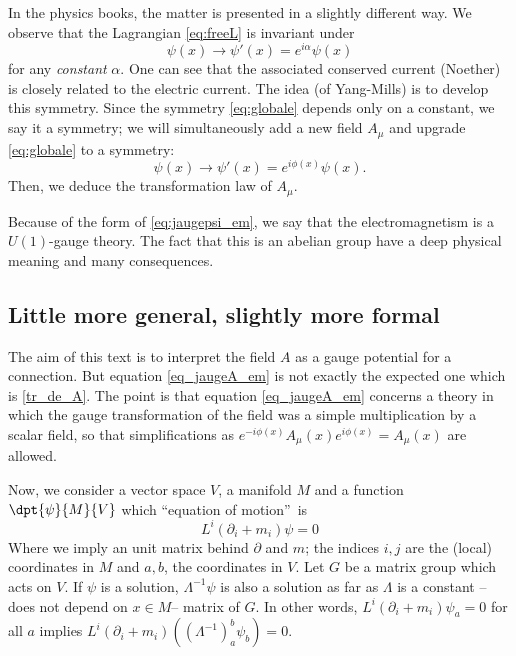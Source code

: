 \begin{remark}
In the physics books, the matter is presented in a slightly different way. We observe that the Lagrangian \eqref{eq:freeL} is invariant under
\begin{equation}\label{eq:globale}
\psi(x)\rightarrow\psi'(x)=e^{i\alpha}\psi(x)
\end{equation}
%
for any \emph{constant} $\alpha$. One can see that the associated conserved current (Noether) is closely related to the electric current. The idea (of Yang-Mills) is to develop this symmetry. Since the symmetry \eqref{eq:globale} depends only on a constant, we say it a  symmetry; we will simultaneously add a new field $A_{\mu}$ and upgrade \eqref{eq:globale} to a  symmetry:
 \begin{equation}\label{eq:locate}
\psi(x)\rightarrow\psi'(x)=e^{i\phi(x)}\psi(x).
\end{equation}
Then, we deduce the transformation law of $A_{\mu}$.
 \end{remark}

Because of the form of \eqref{eq:jaugepsi_em}, we say that the electromagnetism is a $U(1)$-gauge theory. The fact that this is an abelian group have a deep physical meaning and many consequences.

\subsection{Little more general, slightly more formal}

The aim of this text is to interpret the field $A$ as a gauge potential for a connection. But equation \eqref{eq_jaugeA_em} is not exactly the expected one which is \eqref{tr_de_A}. The point is that equation \eqref{eq_jaugeA_em} concerns a theory in which the gauge transformation of the field was a simple multiplication by a scalar field, so that simplifications as $e^{-i\phi(x)}A_{\mu}(x)e^{i\phi(x)}=A_{\mu}(x)$ are allowed.

Now, we consider a vector space $V$, a manifold $M$ and a function $\dpt{\psi}{M}{V}$ which ``equation of motion''\ is
\[
   L^i(\partial_i+m_i)\psi=0
\]
Where we imply an unit matrix behind $\partial$ and $m$; the indices $i,j$ are the (local) coordinates in $M$ and $a,b$, the coordinates in $V$. Let $G$ be a matrix group which acts on $V$. If $\psi$ is a solution, $\Lambda^{-1}\psi$ is also a solution as far as $\Lambda$ is a constant --does not depend on $x\in M$-- matrix of $G$. In other words, $L^i(\partial_i+m_i)\psi_a=0$ for all $a$ implies $L^i(\partial_i+m_i)((\Lambda^{-1})^b_a\psi_b)=0$.

